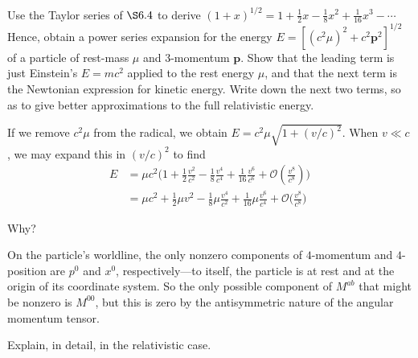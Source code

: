\documentclass[../road-to-reality.tex]{subfiles}
\begin{document}
\begin{questions}
\question Use the Taylor series of $\S6.4$ to derive $(1+x)^{1/2}=1+\frac{1}{2}x-\frac{1}{8}x^2+\frac{1}{16}x^3-\cdots$ Hence, obtain a power series expansion for the energy $E = [(c^2\mu)^2+c^2\mathbf{p}^2]^{1/2}$ of a particle of rest-mass $\mu$ and $3$-momentum $\mathbf{p}$. Show that the leading term is just Einstein's $E=mc^2$ applied to the rest energy $\mu$, and that the next term is the Newtonian expression for kinetic energy. Write down the next two terms, so as to give better approximations to the full relativistic energy.

  \begin{solution}
    If we remove $c^2\mu$ from the radical, we obtain $E = c^2\mu\sqrt{1 +
      (v/c)^2}$. When $v \ll c$, we may expand this in $(v/c)^2$ to find
    \begin{align*}
      E &= \mu{c^2}\Big(1 + \frac{1}{2}\frac{v^2}{c^2} - \frac{1}{8}\frac{v^4}{c^4} +
          \frac{1}{16}\frac{v^6}{c^6} + \mathcal{O}(\frac{v^8}{c^8})\Big) \\
        &= \mu{c^2} + \frac{1}{2}\mu{v}^2 - \frac{1}{8}\mu\frac{v^4}{c^2} + \frac{1}{16}\mu\frac{v^6}{c^4} + \mathcal{O}\Big(\frac{v^8}{c^8}\Big)
    \end{align*}
  \end{solution}

\question Why?

  \begin{solution}
    On the particle's worldline, the only nonzero components of $4$-momentum and
    $4$-position are $p^0$ and $x^0$, respectively---to itself, the particle is
    at rest and at the origin of its coordinate system. So the only possible
    component of $M^{ab}$ that might be nonzero is $M^{00}$, but this is zero by
    the antisymmetric nature of the angular momentum tensor.
  \end{solution}

\question Explain, in detail, in the relativistic case.
\end{questions}
\end{document}
